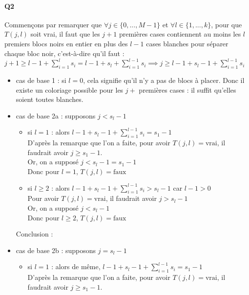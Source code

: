 \documentclass[12pt]{article}
\newcommand{\true}{\text{vrai}}
\newcommand{\false}{\text{faux}}
\begin{document}
	\paragraph{Q2}
	Commençons par remarquer que $ \forall j \in \{0,...,M-1\} $ et $ \forall l \in \{1,...,k\} $, pour que $ T(j,l) $ soit vrai, il faut que les $ j+1 $ premières cases contiennent au moins les $ l $ premiers blocs noirs en entier en plus des $ l-1 $ cases blanches pour séparer chaque bloc noir, c'est-à-dire qu'il faut : \\
	$ j+1 \geq l-1 + \sum\limits_{i=1}^{l} s_i = l-1 + s_l + \sum\limits_{i=1}^{l-1} s_i \implies \boxed{j \geq l-1 + s_l-1 + \sum\limits_{i=1}^{l-1} s_i} $
	\begin{itemize}
		\item cas de base 1 : si $ l = 0 $, cela signifie qu'il n'y a pas de blocs à placer. Donc il existe un coloriage possible pour les $ j+ $ premières cases : il suffit qu'elles soient toutes blanches.
		\item cas de base 2a : supposons $ j < s_l-1 $
		\begin{itemize}
			\item si $ l=1 $ : alors $ l-1 + s_l-1 + \sum\limits_{i=1}^{l-1} s_i = s_1 - 1 $ \\
			D'après la remarque que l'on a faite, pour avoir $ T(j,l) = \true $, il faudrait avoir $ j \geq s_1-1 $. \\
			Or, on a supposé $ j < s_l-1 = s_1 - 1 $ \\
			Donc pour $ l=1 $, $ T(j,l) = \false $
			\item si $ l \geq 2 $ : alors $ l-1 + s_l-1 + \sum\limits_{i=1}^{l-1} s_i > s_l - 1 $ car $ l-1 > 0 $ \\
			Pour avoir $ T(j,l) = \true $, il faudrait avoir $ j > s_l - 1 $ \\
			Or, on a supposé $ j < s_l-1 $ \\
			Donc pour $ l \geq 2 $, $ T(j,l) = \false $
		\end{itemize}
		Conclusion : \fbox{$ \forall l \geq 1 $, si $ j < s_l - 1 $, alors  $ T(j,l) = \false $}
		\item cas de base 2b : supposons $ j = s_l - 1 $
		\begin{itemize}
			\item si $ l=1 $ : alors de même, $ l-1 + s_l-1 + \sum\limits_{i=1}^{l-1} s_i = s_1 - 1 $ \\
			D'après la remarque que l'on a faite, pour avoir $ T(j,l) = \true $, il faudrait avoir $ j \geq s_1-1 $. \\

\end{itemize}
\end{itemize}
\end{document}
